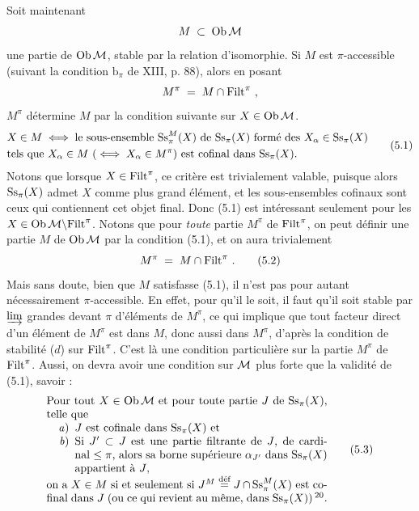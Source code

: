 Soit maintenant
\[
M \;\subset\; \operatorname{Ob}\mathcal{M}
\]
une partie de $\operatorname{Ob}\mathcal{M}$, stable par la relation d'isomorphie. Si $M$ est $\pi$-accessible (suivant la condition $\mathrm{b}_{\pi}$ de XIII, p. 88), alors en posant
\[
M^{\pi} \;=\; M \cap \mathrm{Filt}^{\pi} \ ,
\]
$M^{\pi}$ détermine $M$ par la condition suivante sur $X \in \operatorname{Ob}\mathcal{M}$.
\[
\begin{aligned}
&X \in M \iff \text{le sous-ensemble } \mathrm{Ss}^{M}_{\pi}(X) \text{ de } \mathrm{Ss}_{\pi}(X) \text{ formé des } X_{\alpha} \in \mathrm{Ss}_{\pi}(X)\\
&\text{tels que } X_{\alpha} \in M \ (\iff X_{\alpha} \in M^{\pi}) \text{ est cofinal dans } \mathrm{Ss}_{\pi}(X).
\end{aligned}
\tag*{(5.1)}
\]
Notons que lorsque $X \in \mathrm{Filt}^{\pi}$, ce critère est trivialement valable, puisque alors $\mathrm{Ss}_{\pi}(X)$ admet $X$ comme plus grand élément, et les sous-ensembles cofinaux sont ceux qui contiennent cet objet final. Donc (5.1) est intéressant seulement pour les $X \in \operatorname{Ob}\mathcal{M} \backslash \mathrm{Filt}^{\pi}$. Notons que pour \textit{toute} partie $M^{\pi}$ de $\mathrm{Filt}^{\pi}$, on peut définir une partie $M$ de $\operatorname{Ob}\mathcal{M}$ par la condition (5.1), et on aura trivialement
\[
M^{\pi} \;=\; M \cap \mathrm{Filt}^{\pi} \ . \tag*{(5.2)}
\]
Mais sans doute, bien que $M$ satisfasse (5.1), il n'est pas pour autant nécessairement $\pi$-accessible. En effet, pour qu'il le soit, il faut qu'il soit stable par $\varinjlim$
grandes devant $\pi$ d'éléments de $M^{\pi}$, ce qui implique que tout facteur direct d'un élément de $M^{\pi}$ est dans $M$, donc aussi dans $M^{\pi}$, d'après la condition de stabilité ($d$) sur $\mathrm{Filt}^{\pi}$. C'est là une condition particulière sur la partie $M^{\pi}$ de $\mathrm{Filt}^{\pi}$. Aussi, on devra avoir une condition sur $\mathcal{M}$ plus forte que la validité de (5.1), savoir :
\[
\parbox{0.72\textwidth}{Pour tout $X \in \Ob\cM$ et pour toute partie $J$ de $\Ss_{\pi}(X)$, telle que
\begin{enumerate}[nosep]
\item[\textit{a})] $J$ est cofinale dans $\Ss_{\pi}(X)$ et
\item[\textit{b})] Si $J' \subset J$ est une partie filtrante de $J$, de cardinal $\leq \pi$, alors sa borne supérieure $\alpha_{J'}$ dans $\Ss_{\pi}(X)$ appartient à $J$,
\end{enumerate}
on a $X \in M$ si et seulement si $J^{M} \overset{\text{déf}}{=} J \cap \Ss^{M}_{\pi}(X)$ est cofinal dans $J$ (ou ce qui revient au même, dans $\Ss_{\pi}(X)$)\,\footnotemark[20].}
\tag*{(5.3)}
\]

